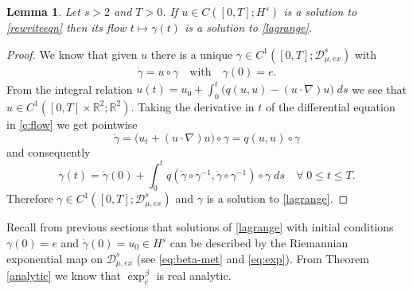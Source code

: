 \documentclass[11pt]{amsart}
\numberwithin{equation}{section}
\newtheorem{lemma}[theorem]{Lemma}
\begin{document}
\begin{lemma}\label{lemma_eulerian_to_lagrangian}
	Let $s >  2$ and $T > 0$. If $u \in C([0,T];H^s)$ is a solution to \eqref{rewriteeqn} then its flow $t\mapsto\gamma(t)$ is a solution to \eqref{lagrange}.
\end{lemma}

\begin{proof}
	We know that given $u$ there is a unique $	\gamma \in C^1([0,T];\mathcal{D}_{\mu, ex}^s)$ with
	\begin{align}\label{e:flow}
	\dot{\gamma} = u \circ 	\gamma\quad 	\text{with}\quad\gamma(0)=e.
	\end{align}
	From the integral relation $u(t)=u_0 + \int_0^t \big(q(u,u)-(u \cdot \nabla) u\big) \;ds$ we see that $u \in C^1([0,T] \times \mathbb R^2;\mathbb R^2)$. Taking the derivative in $t$ of the differential equation in \eqref{e:flow} we get pointwise
	\[
	\ddot{\gamma} = \big(u_t + (u \cdot \nabla)u\big) \circ 	\gamma = q(u,u) \circ 	\gamma
	\]
	and consequently
	\[
	\gamma(t) = 	\dot{\gamma}(0) + \int_0^t q(	\dot{\gamma} \circ 	\gamma^{-1},	\dot{\gamma} \circ 	\gamma^{-1}) \circ \gamma \; ds \quad \forall \; 0 \leq t \leq T.
	\]
	 Therefore $	\gamma \in C^1([0,T];\mathcal{D}_{\mu,ex}^s)$ and $\gamma$ is a solution to \eqref{lagrange}.
\end{proof}

Recall from previous sections that solutions of \eqref{lagrange} with initial conditions $\gamma(0)=e$ and $\dot{\gamma}(0)= u_0 \in H^s$ can be described by the Riemannian exponential map on $\mathcal{D}_{\mu,ex}^s$ (see \eqref{eq:beta-met} and \eqref{eq:exp}). From Theorem \ref{analytic} we know that $\exp_e^{\beta}$ is real analytic. 

\end{document}
